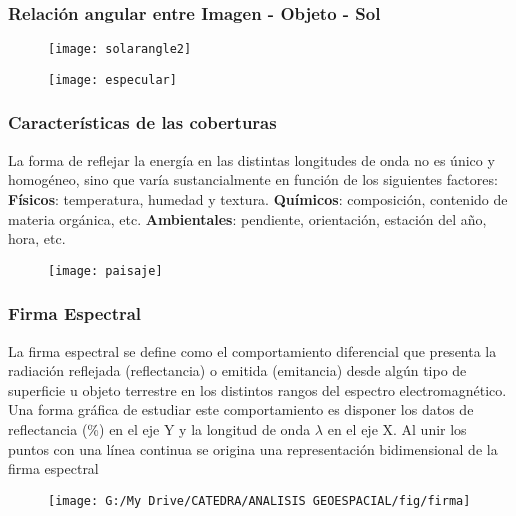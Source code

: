 \documentclass[]{beamer}
\begin{document}
\begin{frame}
\frametitle{Relación angular entre Imagen - Objeto - Sol}
  \begin{figure}
    \centering
    \texttt{[image: solarangle2]}
  \end{figure}
\end{frame}
\begin{frame}
  \begin{figure}
    \centering
    \texttt{[image: especular]}
  \end{figure}
\end{frame}
\begin{frame}
\frametitle{Características de las coberturas}
\scriptsize{
La forma de reflejar la energía en las distintas longitudes de onda no es único y homogéneo, sino que varía sustancialmente en función de los siguientes factores:\vfill
\textbf{Físicos}: temperatura, humedad y textura.\vfill
\textbf{Químicos}: composición, contenido de materia orgánica, etc.\vfill
\textbf{Ambientales}: pendiente, orientación, estación del año, hora, etc.
}
 \begin{figure}
    \centering
    \texttt{[image: paisaje]}
  \end{figure}
\end{frame}
\begin{frame}
  \begin{figure}
    \centering
    \qquad
    \label{fig:1}
  \end{figure}
  \begin{figure}
    \centering
    \qquad    
    \label{fig:2}
  \end{figure}
\end{frame}
 \begin{frame}
\frametitle{Firma Espectral}
\justifying
\scriptsize{La firma espectral se define como el comportamiento diferencial que presenta la radiación reflejada (reflectancia) o emitida (emitancia) desde algún tipo de superficie u objeto terrestre en los distintos rangos del espectro electromagnético. Una forma gráfica de estudiar este comportamiento es disponer los datos de reflectancia (\%) en el eje Y y la longitud de onda $\lambda$ en el eje X. Al unir los puntos con una línea continua se origina una representación bidimensional de la firma espectral}
 \begin{figure}
    \centering
    \texttt{[image: G:/My Drive/CATEDRA/ANALISIS GEOESPACIAL/fig/firma]}
  \end{figure}
\end{frame}
\end{document}
